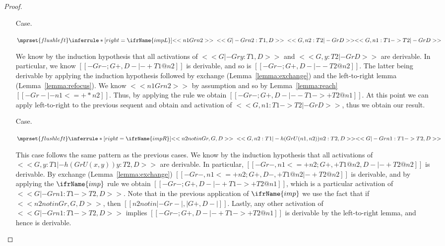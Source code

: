 \begin{proof}
\begin{itemize}
  \item[Case.]\ \\ 
    \begin{center}
      \begin{math}
        $$\mprset{flushleft}
        \inferrule* [right=\ifrName{impL}] {
          <<n1 Gr n2>>
          \\\\
          <<G |- Gr n2 : T1, D>>
          \\\\
          <<G, n2 : T2 |- Gr D>>
        }{<<G , n1 : T1 -> T2 |- Gr D>>}
      \end{math}
    \end{center}   
    We know by the induction hypothesis that all activations of $<<G |- Gr y : T1, D>>$ and 
    $<<G, y : T2 |- Gr D>>$ are derivable.  In particular, we know 
    $[[-Gr-;{G}+,{D}- |- +{T1}@n2]]$ is derivable, and so is $[[-Gr-;{G}+, {D}- |- -{T2}@n2]]$. The latter
    being derivable by applying the induction hypothesis followed by exchange 
    (Lemma~\ref{lemma:exchange}) and the left-to-right lemma (Lemma~\ref{lemma:refocus}). We know $<<n1 Gr n2>>$ by assumption
    and so by Lemma~\ref{lemma:reach} $[[-Gr- |- n1 <=+* n2]]$.  Thus, by applying the  rule we obtain
    $[[-Gr-;{G}+,{D}- |- - {T1}->+{T2} @ n1]]$.  At this point we can apply left-to-right to the previous sequent and obtain 
    and activation of $<<G , n1 : T1 -> T2 |- Gr D>>$, thus we obtain our result.

  \item[Case.]\ \\ 
    \begin{center}
      \begin{math}
        $$\mprset{flushleft}
        \inferrule* [right=\ifrName{impR}] {
          <<n2 notin Gr, G, D>>
          \\\\
          <<G, n2 : T1 |- h(Gr U {(n1,n2)}) n2 : T2, D>>
        }{<<G |- Gr n1 : T1 -> T2, D>>}
      \end{math}
    \end{center}
    This case follows the same pattern as the previous cases.  We know by the induction hypothesis
    that all activations of $<<G, y : T1 |- h(Gr U {(x,y)}) y : T2, D>>$ are derivable.  In particular,
    $[[-Gr-,n1 <=+ n2 ; {G}+, +{T1}@n2,{D}- |- +{T2}@n2]]$ is
    derivable.  By exchange (Lemma~\ref{lemma:exchange})
    $[[-Gr-,n1 <=+ n2 ; {G}+, {D}-,+{T1}@n2 |- +{T2}@n2]]$ is derivable, and by applying the $\ifrName{imp}$ rule
    we obtain $[[-Gr- ; {G}+, {D}- |- + {T1} ->+ {T2}@n1]]$, which is a particular activation of 
    $<<G |- Gr n1 : T1 -> T2, D>>$.  Note that in the previous application of $\ifrName{imp}$ we use
    the fact that if $<<n2 notin Gr, G, D>>$, then $[[n2 notin |-Gr-|,|{G}+,{D}-|]]$. 
    Lastly, any other activation of $<<G |- Gr n1 : T1 -> T2, D>>$ implies
    $[[-Gr- ; {G}+, {D}- |- + {T1} ->+ {T2}@n1]]$ is derivable by the left-to-right lemma, and hence is derivable.


\end{itemize}
\end{proof}
